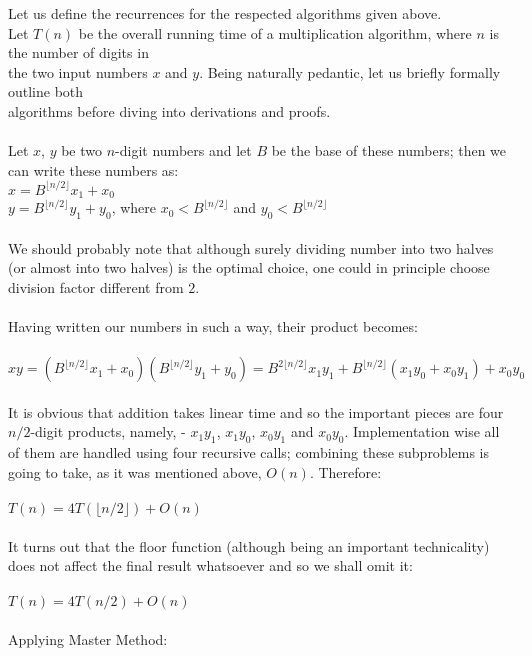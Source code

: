 \documentclass[a4paper]{article}
\begin{document}
Let us define the recurrences for the respected algorithms given above.\\ 
Let $T(n)$ be the overall running time of a multiplication algorithm, where $n$ is the number of digits in \\
the two input numbers $x$ and $y$. Being naturally pedantic, let us briefly formally outline both \\
algorithms before diving into derivations and proofs. \\ \\
Let $x$, $y$ be two $n$-digit numbers and let $B$ be the base of these numbers; then we can write these numbers as: \\
$x = B^{\lfloor n/2 \rfloor }x_1 + x_0$ \\
$y = B^{\lfloor n/2 \rfloor} y_1 + y_0$, where $x_0 < B^{\lfloor n/2 \rfloor }$ and $y_0<B^{\lfloor n/2 \rfloor}$ \\ \\
We should probably note that although surely dividing number into two halves (or almost into two halves) is the optimal choice, one could in principle choose division factor different from $2$. \\ \\
Having written our numbers in such a way, their product becomes: \\ \\
$xy = (B^{\lfloor n/2 \rfloor }x_1 + x_0)(B^{\lfloor n/2 \rfloor} y_1 + y_0) = B^{2\lfloor n/2 \rfloor}x_1y_1 + B^{\lfloor n/2 \rfloor }(x_1y_0 + x_0y_1) + x_0y_0 $ \\ \\
It is obvious that addition takes linear time and so the important pieces are four $n/2$-digit products, namely, - $x_1y_1$, $x_1y_0$, $x_0y_1$ and $x_0y_0$. Implementation wise all of them are handled using four recursive calls; combining these subproblems is going to take, as it was mentioned above, $O(n)$. Therefore: \\ \\
$T(n) = 4T(\lfloor n/2 \rfloor) + O(n)$\\ \\
It turns out that the floor function (although being an important technicality) does not affect the final result whatsoever and so we shall omit it: \\ \\
$T(n) = 4T(n/2) + O(n)$\\ \\
Applying Master Method: \\ \\
\end{document}
